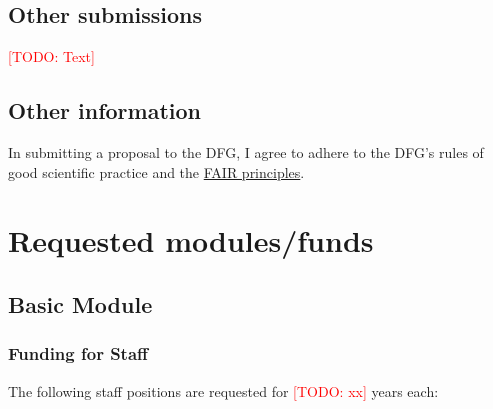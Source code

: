 \documentclass[american,firsttime]{dfgproposal}
\newcommand{\todo}[1]{\xspace{\textcolor{red}{[TODO: #1]}}\xspace}
\begin{document}
	\subsection{Other submissions}
	\todo{Text}
	
	
	
	\subsection{Other information}
	In submitting a proposal to the DFG, I agree to adhere to the DFG's rules of good scientific practice and the \href{https://www.nature.com/articles/sdata201618}{FAIR principles}.
	
	
	\section{Requested modules/funds}
	
	\subsection{Basic Module}
	
	\subsubsection{Funding for Staff}
	\begin{funds}
		The following staff positions are requested for \todo{xx} years each:
		
	\end{funds}
	
\end{document}
